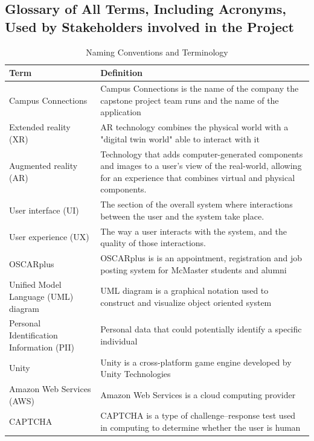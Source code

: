 \documentclass[12pt]{article}
\begin{document}
\subsection{Glossary of All Terms, Including Acronyms, Used by Stakeholders
involved in the Project}
\begin{table}[H]
    \centering
    \begin{tabular}{|p{0.3\linewidth} | p{0.7\linewidth}| }
    \hline
    \textbf{Term} & \textbf{Definition}\\
    \hline
    Campus Connections & Campus Connections is the name of the company the capstone project team runs and the name of the application\\
    \hline
    Extended reality (XR) & AR technology combines the physical world with a "digital twin world" able to interact with it\\
    \hline
    Augmented reality (AR) & Technology that adds computer-generated components and images to a user’s view of the real-world, allowing for an experience that combines virtual and physical components.\\
    \hline
    User interface (UI) & The section of the overall system where interactions between the user and the system take place.\\
    \hline
    User experience (UX) & The way a user interacts with the system, and the quality of those interactions.\\
    \hline
    OSCARplus & OSCARplus is is an appointment, registration and job posting system for McMaster students and alumni\\
    \hline
    Unified Model Language (UML) diagram & UML diagram is a graphical notation used to construct and visualize object oriented system\\
    \hline
    Personal Identification Information (PII) & Personal data that could potentially identify a specific individual\\
    \hline
    Unity & Unity is a cross-platform game engine developed by Unity Technologies\\
    \hline
    Amazon Web Services (AWS) & Amazon Web Services is a cloud computing provider\\
    \hline
    CAPTCHA & CAPTCHA is a type of challenge–response test used in computing to determine whether the user is human\\
    \hline
    \end{tabular}
    \caption{Naming Conventions and Terminology}
    \label{TblNaming}
\end{table}
\end{document}
